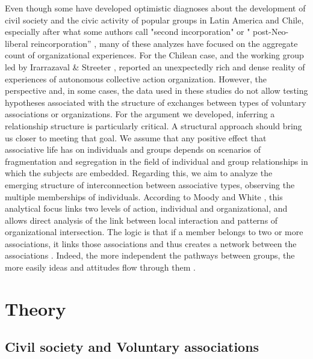 Even though some have developed optimistic diagnoses about the development of civil society and the civic activity of popular groups in Latin America and Chile, especially after what some authors call "second incorporation" or " post-Neo-liberal reincorporation” \parencite{rossi_second_2015}, many of these analyzes have focused on the aggregate count of organizational experiences. For the Chilean case, \parencite{programa_de_las_naciones_unidas_para_el_desarrollo_desarrollo_2000} and the working group led by  Irarrazaval \& Streeter \parencite*{irarrazaval_chile_2017}, reported an unexpectedly rich and dense reality of experiences of autonomous collective action organization. However, the perspective and, in some cases, the data used in these studies do not allow testing hypotheses associated with the structure of exchanges between types of voluntary associations or organizations. For the argument we developed, inferring a relationship structure is particularly critical. A structural approach should bring us closer to meeting that goal. We assume that any positive effect that associative life has on individuals and groups depends on scenarios of fragmentation and segregation in the field of individual and group relationships in which the subjects are embedded. Regarding this, we aim to analyze the emerging structure of interconnection between associative types, observing the multiple memberships of individuals. According to Moody and White  \parencite*{moody_structural_2003}, this analytical focus links two levels of action, individual and organizational, and allows direct analysis of the link between local interaction and patterns of organizational intersection. The logic is that if a member belongs to two or more associations, it links those associations and thus creates a network between the associations \parencite{moody_structural_2003}. Indeed, the more independent the pathways between groups, the more easily ideas and attitudes flow through them \parencite{moody_structural_2003}.
\bigskip

\section{Theory}
\subsection{Civil society and Voluntary associations}

